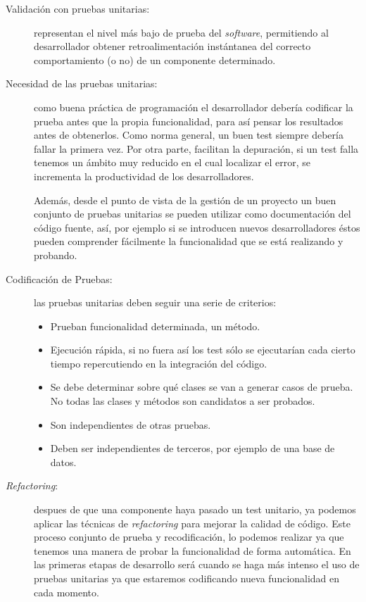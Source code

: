 \begin{description}

\item [Validación con pruebas unitarias:] representan el nivel más bajo de prueba del \textit{software}, 
permitiendo al desarrollador obtener retroalimentación instántanea del correcto
comportamiento (o no) de un componente determinado.

\item [Necesidad de las pruebas unitarias:] como buena práctica de programación
el desarrollador debería codificar la prueba antes que la propia funcionalidad,
para así pensar los resultados antes de obtenerlos. Como norma general, un buen
test siempre debería fallar la primera vez. Por otra parte, facilitan la
depuración, si un test falla tenemos un ámbito muy reducido en el cual localizar
el error, se incrementa la productividad de los desarrolladores. 

Además, desde el punto de vista de la gestión de un proyecto un buen conjunto de
pruebas unitarias se pueden utilizar como documentación del código fuente, así,
por ejemplo si se introducen nuevos desarrolladores éstos pueden comprender
fácilmente la funcionalidad que se está realizando y probando.

\item [Codificación de Pruebas:] las pruebas unitarias deben seguir una serie de
criterios:
\begin{itemize}
  \item Prueban funcionalidad determinada, un método.
  \item Ejecución rápida, si no fuera así los test sólo se ejecutarían
  cada cierto tiempo repercutiendo en la integración del código.
  \item Se debe determinar sobre qué clases se van a generar casos de prueba. No
  todas las clases y métodos son candidatos a ser probados.
  \item Son independientes de otras pruebas.
  \item Deben ser independientes de terceros, por ejemplo de una base de datos.
\end{itemize}

\item [\textit{Refactoring}:] despues de que una componente haya pasado un test unitario,
ya podemos aplicar las técnicas de \textit{refactoring} para mejorar la calidad
de código. Este proceso conjunto de prueba y recodificación, lo podemos realizar
ya que tenemos una manera de probar la funcionalidad de forma automática. En las
primeras etapas de desarrollo será cuando se haga más intenso el uso de pruebas
unitarias ya que estaremos codificando nueva funcionalidad en cada momento.
\end{description}

